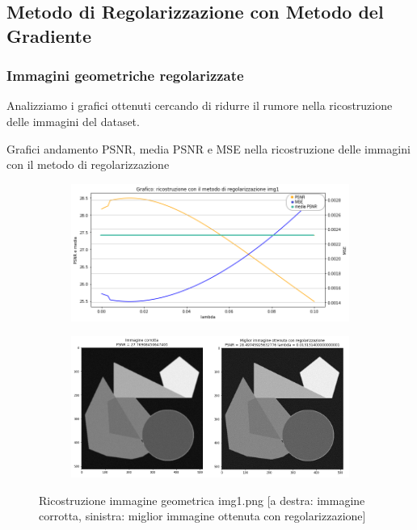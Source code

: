 \subsection{Metodo di Regolarizzazione con Metodo del Gradiente }

\subsubsection{Immagini geometriche regolarizzate}
Analizziamo i grafici ottenuti cercando di ridurre il rumore nella ricostruzione delle immagini del dataset. 

Grafici andamento PSNR, media PSNR e MSE nella ricostruzione delle immagini con il metodo di regolarizzazione

\begin{figure}[H]
    \centering
    \begin{subfigure}{0.5\textwidth}
        \includegraphics[width=\textwidth]{imgRicostruzione/grafico1minimize.png}
    \end{subfigure}%
    \begin{subfigure}{0.5\textwidth}
        \centering
        \includegraphics[width=\textwidth]{imgRicostruzione/ricostruzione1minimize.png}
    \end{subfigure}
    \caption{Ricostruzione immagine geometrica img1.png [a destra: immagine corrotta, sinistra: miglior immagine ottenuta con regolarizzazione]}
    

\end{figure}
